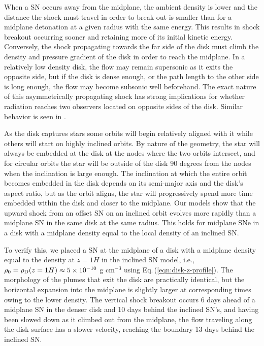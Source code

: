 When a SN occurs away from the midplane, the ambient density is lower and the distance the shock must travel in order to break out is smaller than for a midplane detonation at a given radius with the same energy.
This results in shock breakout occurring sooner and retaining more of its initial kinetic energy.
Conversely, the shock propagating towards the far side of the disk must climb the density and pressure gradient of the disk in order to reach the midplane.
In a relatively low density disk, the flow may remain supersonic as it exits the opposite side, but if the disk is dense enough, or the path length to the other side is long enough, the flow may become subsonic well beforehand.
The exact nature of this asymmetrically propagating shock has strong implications for whether radiation reaches two observers located on opposite sides of the disk.
Similar behavior is seen in \citet{Grishin+21}.

As the disk captures stars \citep{MacLeodLin20,Nasim+22} some orbits will begin relatively aligned with it while others will start on highly inclined orbits.
By nature of the geometry, the star will always be embedded at the disk at the nodes where the two orbits intersect, and for circular orbits the star will be outside of the disk 90 degrees from the nodes when the inclination is large enough.
The inclination at which the entire orbit becomes embedded in the disk depends on its semi-major axis and the disk's aspect ratio, but as the orbit aligns, the star will progressively spend more time embedded within the disk and closer to the midplane.
Our models show that the upward shock from an offset SN on an inclined orbit evolves more rapidly than a midplane SN in the same disk at the same radius.
This holds for midplane SNe in a disk with a midplane density equal to the local density of an inclined SN.

To verify this, we placed a SN at the midplane of a disk with a midplane density equal to the density at $z=1H$ in the inclined SN model, i.e., $\rho_0=\rho_{\rm D}(z=1H)\approx5\times10^{-10}$ g cm$^{-3}$ using Eq.\,(\ref{eqn:disk-z-profile}).
The morphology of the plumes that exit the disk are practically identical, but the horizontal expansion into the midplane is slightly larger at corresponding times owing to the lower density.
The vertical shock breakout occurs 6 days ahead of a midplane SN in the denser disk and 10 days behind the inclined SN's, and having been slowed down as it climbed out from the midplane, the flow traveling along the disk surface has a slower velocity, reaching the boundary 13 days behind the inclined SN.

